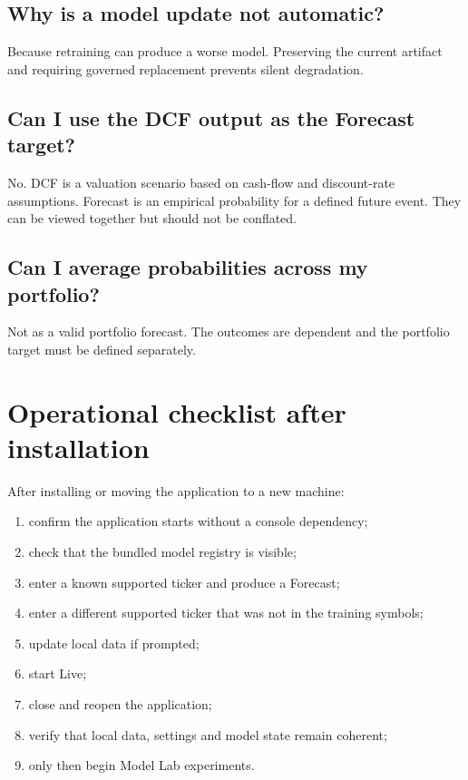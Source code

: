 \documentclass[11pt]{article}
\begin{document}
\subsection{Why is a model update not automatic?}
Because retraining can produce a worse model. Preserving the current artifact and requiring governed replacement prevents silent degradation.

\subsection{Can I use the DCF output as the Forecast target?}
No. DCF is a valuation scenario based on cash-flow and discount-rate assumptions. Forecast is an empirical probability for a defined future event. They can be viewed together but should not be conflated.

\subsection{Can I average probabilities across my portfolio?}
Not as a valid portfolio forecast. The outcomes are dependent and the portfolio target must be defined separately.

\section{Operational checklist after installation}
After installing or moving the application to a new machine:
\begin{enumerate}[itemsep=0.2em]
\item confirm the application starts without a console dependency;
\item check that the bundled model registry is visible;
\item enter a known supported ticker and produce a Forecast;
\item enter a different supported ticker that was not in the training symbols;
\item update local data if prompted;
\item start Live;
\item close and reopen the application;
\item verify that local data, settings and model state remain coherent;
\item only then begin Model Lab experiments.
\end{enumerate}
\end{document}
